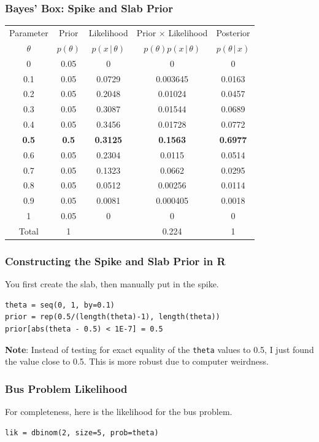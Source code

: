 \documentclass{beamer}
\newcommand{\given}{\,|\,}
\begin{document}
\begin{frame}
\frametitle{Bayes' Box: Spike and Slab Prior}

\centering
{\footnotesize
\begin{tabular}{|c|c|c|c|c|}
\hline
Parameter & Prior & Likelihood & Prior $\times$ Likelihood & Posterior \\
$\theta$  & $p(\theta)$ & $p(x \given \theta)$ & $p(\theta)p(x\given \theta)$ & $p(\theta\given x)$ \\
\hline
0 & 0.05 & 0 & 0 & 0\\
0.1 & 0.05 & 0.0729  & 0.003645 & 0.0163\\
0.2 & 0.05 & 0.2048 & 0.01024  & 0.0457 \\
0.3 & 0.05 & 0.3087 & 0.01544 & 0.0689 \\
0.4 & 0.05 & 0.3456 & 0.01728 & 0.0772 \\
{\bf 0.5} & {\bf 0.5} & {\bf 0.3125} & {\bf 0.1563} & {\bf 0.6977} \\
0.6 & 0.05 & 0.2304 & 0.0115 & 0.0514 \\
0.7 & 0.05 & 0.1323 & 0.0662 & 0.0295 \\
0.8 & 0.05 & 0.0512 & 0.00256 & 0.0114 \\
0.9 & 0.05 & 0.0081 & 0.000405 & 0.0018 \\
1 & 0.05 & 0 & 0 & 0 \\
\hline
Total & 1 & & 0.224 & 1 \\
\hline
\end{tabular}
}

\end{frame}

\begin{frame}[fragile]
\frametitle{Constructing the Spike and Slab Prior in R}
You first create the slab, then manually put in the spike.

\begin{verbatim}
theta = seq(0, 1, by=0.1)
prior = rep(0.5/(length(theta)-1), length(theta))
prior[abs(theta - 0.5) < 1E-7] = 0.5
\end{verbatim}
\pause

{\bf Note}: Instead of testing for exact equality of the
\texttt{theta} values to 0.5, I just found the
value close to 0.5. This is more robust due to computer weirdness.
\end{frame}

\begin{frame}[fragile]
\frametitle{Bus Problem Likelihood}
For completeness, here is the likelihood for the bus problem.

\begin{verbatim}
lik = dbinom(2, size=5, prob=theta)
\end{verbatim}
\end{frame}
\end{document}
